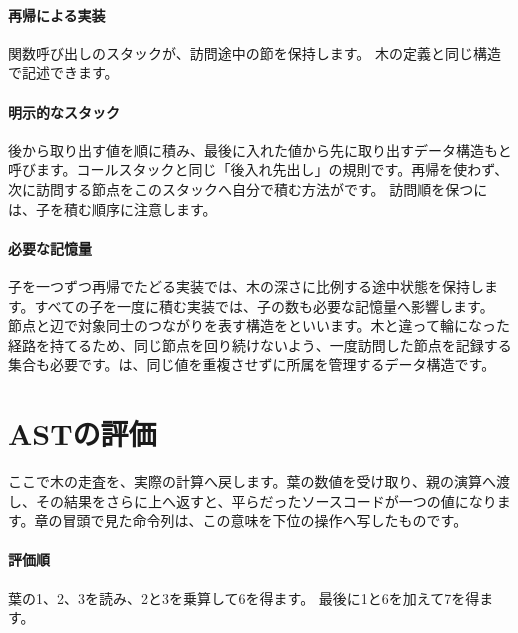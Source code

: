 \paragraph{再帰による実装}
        関数呼び出しのスタックが、訪問途中の節を保持します。
        木の定義と同じ構造で記述できます。

\par
\endgroup
\medskip
\begingroup
\paragraph{明示的なスタック}
        後から取り出す値を順に積み、最後に入れた値から先に取り出すデータ構造もと呼びます。コールスタックと同じ「後入れ先出し」の規則です。再帰を使わず、次に訪問する節点をこのスタックへ自分で積む方法がです。
        訪問順を保つには、子を積む順序に注意します。

\paragraph{必要な記憶量}
        子を一つずつ再帰でたどる実装では、木の深さに比例する途中状態を保持します。すべての子を一度に積む実装では、子の数も必要な記憶量へ影響します。
        節点と辺で対象同士のつながりを表す構造をといいます。木と違って輪になった経路を持てるため、同じ節点を回り続けないよう、一度訪問した節点を記録する集合も必要です。は、同じ値を重複させずに所属を管理するデータ構造です。

\par
\endgroup
\par
\endgroup


\section{ASTの評価}
\label{sec:02-language-12}

ここで木の走査を、実際の計算へ戻します。葉の数値を受け取り、親の演算へ渡し、その結果をさらに上へ返すと、平らだったソースコードが一つの値になります。章の冒頭で見た命令列は、この意味を下位の操作へ写したものです。

\begingroup
  \centering
  \vspace{4mm}
\begingroup
\paragraph{評価順}
        葉の1、2、3を読み、2と3を乗算して6を得ます。
        最後に1と6を加えて7を得ます。

